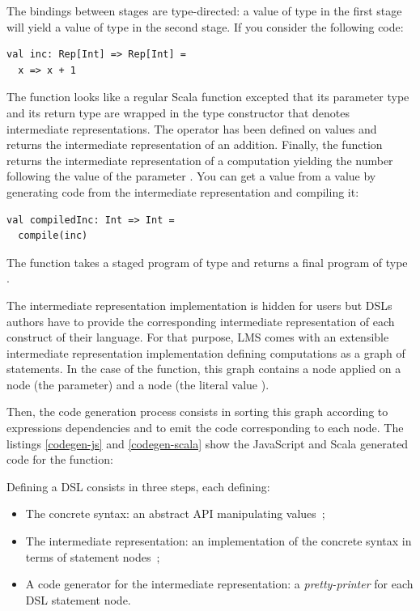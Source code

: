 \documentclass[american,english,runningheads]{llncs}
\begin{document}
The bindings between stages are type-directed: a value of type  in the first stage will yield a value
of type  in the second stage. If you consider the following code:
\begin{lstlisting}
val inc: Rep[Int] => Rep[Int] =
  x => x + 1
\end{lstlisting}
The function looks like
a regular Scala function excepted that its parameter type and its return type are wrapped in the  type
constructor that denotes intermediate representations. The \code{+} operator has been defined on 
values and returns the intermediate representation of an addition. Finally, the  function returns the
intermediate representation of a computation yielding the number following the value of the parameter . You
can get a  value from a  value by generating code from the intermediate representation and
compiling it:
\begin{lstlisting}
val compiledInc: Int => Int =
  compile(inc)
\end{lstlisting}
The  function takes a staged program of type  and returns a final program of
type .

The intermediate representation implementation is hidden for users but DSLs authors have to provide the corresponding
intermediate representation of each construct of their language. For that purpose, LMS comes with an extensible
intermediate representation implementation defining computations as a graph of statements. In the case of the
 function, this graph contains a  node applied on a  node (the  parameter) and
a  node (the literal value ).

Then, the code generation process consists in sorting this graph according to expressions dependencies and to emit
the code corresponding to each node. The listings \ref{codegen-js} and \ref{codegen-scala} show the JavaScript and
Scala generated code for the  function:
\begin{multicols}{2}


\end{multicols}

Defining a DSL consists in three steps, each defining:

\begin{itemize}
\item The concrete syntax: an abstract API manipulating  values~;
\item The intermediate representation: an implementation of the concrete syntax in terms of statement nodes~;
\item A code generator for the intermediate representation: a \emph{pretty-printer} for each DSL statement node.
\end{itemize}
\end{document}
